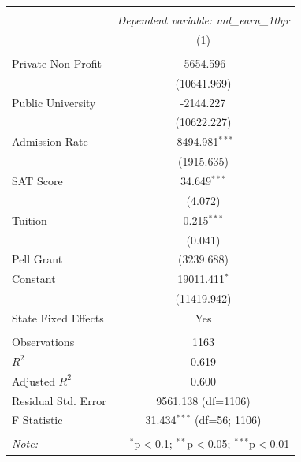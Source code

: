 \begin{table}[!htbp] \centering
\begin{tabular}{@{\extracolsep{5pt}}lc}
\\[-1.8ex]\hline
\hline \\[-1.8ex]
& \multicolumn{1}{c}{\textit{Dependent variable: md_earn_10yr}} \
\cr \cline{2-2}
\\[-1.8ex] & (1) \\
\hline \\[-1.8ex]
 Private Non-Profit & -5654.596$^{}$ \\
& (10641.969) \\
 Public University & -2144.227$^{}$ \\
& (10622.227) \\
 Admission Rate & -8494.981$^{***}$ \\
& (1915.635) \\
 SAT Score & 34.649$^{***}$ \\
& (4.072) \\
 Tuition & 0.215$^{***}$ \\
& (0.041) \\
 Pell Grant %
& (3239.688) \\
 Constant & 19011.411$^{*}$ \\
& (11419.942) \\
 State Fixed Effects & Yes \\
\hline \\[-1.8ex]
 Observations & 1163 \\
 $R^2$ & 0.619 \\
 Adjusted $R^2$ & 0.600 \\
 Residual Std. Error & 9561.138 (df=1106) \\
 F Statistic & 31.434$^{***}$ (df=56; 1106) \\
\hline
\hline \\[-1.8ex]
\textit{Note:} & \multicolumn{1}{r}{$^{*}$p$<$0.1; $^{**}$p$<$0.05; $^{***}$p$<$0.01} \\
\end{tabular}
\end{table}